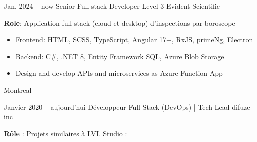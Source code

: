 \documentclass[
  a4paper,
   maincolor=cvblue,
   sectioncolor=cvblue,
   sidebarwidth=0.323\paperwidth,
]{fortysecondscv}
\begin{document}
\newpage
\restoregeometry
{}\paperwidth

\makefrontsidebar

\vspace*{-3.7em} %



\begin{cvtableNew}


  \cvitemRightNew
    {Jan, 2024 – now} %
    {Senior Full-stack Developer Level 3} %
    {Evident Scientific} %
    {
      \vspace{0.1pt} %
      \fontsize{10.8pt}{12pt}\selectfont %
      \textbf{Role}: Application full-stack (cloud et desktop) d’inspections par boroscope\vspace{4pt}
      \begin{itemize}[itemsep=-1mm, topsep=0pt, leftmargin=8pt]
        \item Frontend: HTML, SCSS, TypeScript, Angular 17+, RxJS, primeNg, Electron\vspace{5pt}
        \item Backend: C\#, .NET 8, Entity Framework SQL, Azure Blob Storage\vspace{5pt}
        \item Design and develop APIs and microservices as Azure Function App\vspace{5pt}
      \end{itemize}
    }
    {Montreal} %

    \vspace{1.6mm} %


  \cvitemRightNew
  {Janvier 2020 – aujourd’hui} %
  {Développeur Full Stack (DevOps) | Tech Lead} %
  {difuze inc} %
  {
    \vspace{0.1pt}
    \fontsize{10.8pt}{12pt}\selectfont
    \textbf{Rôle} : Projets similaires à LVL Studio :\vspace{5pt}

}
\end{cvtableNew}
\end{document}
